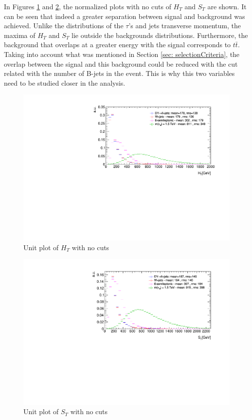 In Figures \ref{fig: HTunitNC} and \ref{fig: STunitNC}, the normalized plots with no cuts of $H_{T}$ and $S_{T}$ are shown. It can be seen that indeed a greater separation between signal and background was achieved. Unlike the distributions of the $\tau$'s and jets transverse momentum, the maxima of $H_{T}$ and $S_{T}$ lie outside the backgrounds distributions. Furthermore, the background that overlaps at a greater energy with the signal corresponds to $t\bar{t}$. Taking into account what was mentioned in Section \ref{sec: selectionCriteria}, the overlap between the signal and this background could be reduced with the cut related with the number of B-jets in the event. This is why this two variables need to be studied closer in the analysis.

\begin{figure}
\includegraphics[width=\linewidth]{Plots/HT_unitNC.pdf}
\caption{Unit plot of $H_{T}$ with no cuts}
\label{fig: HTunitNC}
\end{figure}

\begin{figure}
\centering
\includegraphics[width=\linewidth]{Plots/ST_unitNC.pdf}
\caption{Unit plot of $S_{T}$ with no cuts}
\label{fig: STunitNC}
\end{figure}

